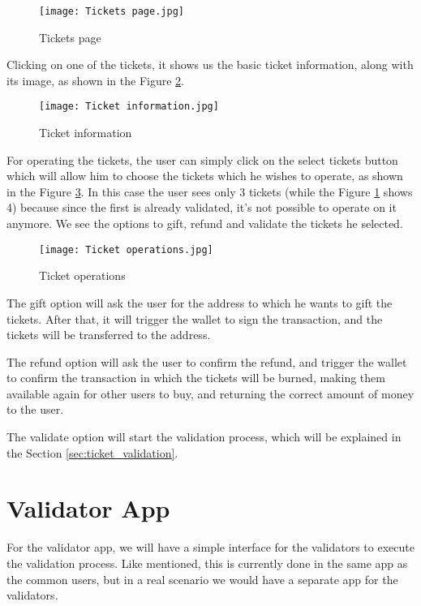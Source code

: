 \begin{figure}[H]
	\texttt{[image: Tickets page.jpg]}
	\centering
	\caption{Tickets page}
	\label{fig:tickets_page}
\end{figure}

Clicking on one of the tickets, it shows us the basic ticket information, along
with its image, as shown in the Figure \ref{fig:ticket_information}.

\begin{figure}[H]
	\texttt{[image: Ticket information.jpg]}
	\centering
	\caption{Ticket information}
	\label{fig:ticket_information}
\end{figure}

For operating the tickets, the user can simply click on the select tickets
button which will allow him to choose the tickets which he wishes to operate,
as shown in the Figure \ref{fig:ticket_operations}. In this case the user sees
only 3 tickets (while the Figure \ref{fig:tickets_page} shows 4) because since
the first is already validated, it's not possible to operate on it anymore. We
see the options to gift, refund and validate the tickets he selected.

\begin{figure}[H]
	\texttt{[image: Ticket operations.jpg]}
	\centering
	\caption{Ticket operations}
	\label{fig:ticket_operations}
\end{figure}

The gift option will ask the user for the address to which he wants to gift the
tickets. After that, it will trigger the wallet to sign the transaction, and
the tickets will be transferred to the address.

The refund option will ask the user to confirm the refund, and trigger the
wallet to confirm the transaction in which the tickets will be burned, making
them available again for other users to buy, and returning the correct amount
of money to the user.

The validate option will start the validation process, which will be explained
in the Section \ref{sec:ticket_validation}.

\section{Validator App}
\label{sec:validator_app}

For the validator app, we will have a simple interface for the validators to
execute the validation process. Like mentioned, this is currently done in the
same app as the common users, but in a real scenario we would have a separate
app for the validators.

